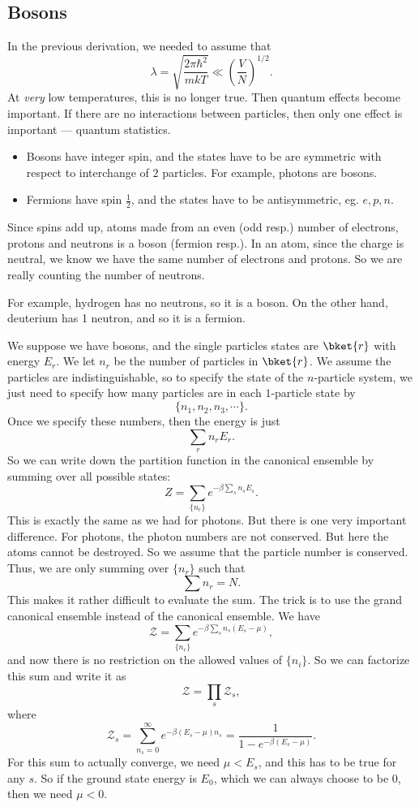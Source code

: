 \documentclass[a4paper]{article}
\begin{document}
\subsection{Bosons}
In the previous derivation, we needed to assume that
\[
  \lambda = \sqrt{\frac{2\pi \hbar^2}{mkT}} \ll \left(\frac{V}{N}\right)^{1/2}.
\]
At \emph{very} low temperatures, this is no longer true. Then quantum effects become important. If there are no interactions between particles, then only one effect is important --- quantum statistics.
\begin{itemize}
  \item Bosons have integer spin, and the states have to be are symmetric with respect to interchange of $2$ particles. For example, photons are bosons.
  \item Fermions have spin $\frac{1}{2}$, and the states have to be antisymmetric, eg. $e, p, n$.
\end{itemize}
Since spins add up, atoms made from an even (odd resp.) number of electrons, protons and neutrons is a boson (fermion resp.). In an atom, since the charge is neutral, we know we have the same number of electrons and protons. So we are really counting the number of neutrons.

For example, hydrogen has no neutrons, so it is a boson. On the other hand, deuterium has 1 neutron, and so it is a fermion.

We suppose we have bosons, and the single particles states are $\bket{r}$ with energy $E_r$. We let $n_r$ be the number of particles in $\bket{r}$. We assume the particles are indistinguishable, so to specify the state of the $n$-particle system, we just need to specify how many particles are in each $1$-particle state by
\[
  \{n_1, n_2, n_3, \cdots\}.
\]
Once we specify these numbers, then the energy is just
\[
  \sum_r n_r E_r.
\]
So we can write down the partition function in the canonical ensemble by summing over all possible states:
\[
  Z = \sum_{\{n_r\}} e^{-\beta \sum_s n_s E_s}.
\]
This is exactly the same as we had for photons. But there is one very important difference. For photons, the photon numbers are not conserved. But here the atoms cannot be destroyed. So we assume that the particle number is conserved. Thus, we are only summing over $\{n_r\}$ such that
\[
  \sum n_r = N.
\]
This makes it rather difficult to evaluate the sum. The trick is to use the grand canonical ensemble instead of the canonical ensemble. We have
\[
  \mathcal{Z} = \sum_{\{n_r\}} e^{-\beta \sum_s n_s (E_s - \mu)},
\]
and now there is no restriction on the allowed values of $\{n_i\}$. So we can factorize this sum and write it as
\[
  \mathcal{Z} = \prod_s \mathcal{Z}_s,
\]
where
\[
  \mathcal{Z}_s = \sum_{n_s = 0}^\infty e^{-\beta (E_s - \mu) n_s} = \frac{1}{1 - e^{-\beta(E_s - \mu)}}.
\]
For this sum to actually converge, we need $\mu < E_s$, and this has to be true for any $s$. So if the ground state energy is $E_0$, which we can always choose to be $0$, then we need $\mu < 0$.
\end{document}
